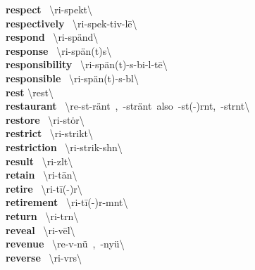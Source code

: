 \documentclass[10pt,a4paper]{article}
\begin{document}
\begin{multicols}{2}
\textbf{ respect }\quad \ \textbackslash ri-\textprimstress spekt\textbackslash \\
\textbf{ respectively }\quad \ \textbackslash ri-\textprimstress spek-tiv-l\={e}\textbackslash \\
\textbf{ respond }\quad \ \textbackslash ri-\textprimstress sp\"{a}nd\textbackslash \\
\textbf{ response }\quad \ \textbackslash ri-\textprimstress sp\"{a}n(t)s\textbackslash \\
\textbf{ responsibility }\quad \ \textbackslash ri-\textsecstress sp\"{a}n(t)-s\textschwa -\textprimstress bi-l\textschwa -t\={e}\textbackslash \\
\textbf{ responsible }\quad \ \textbackslash ri-\textprimstress sp\"{a}n(t)-s\textschwa -b\textschwa l\textbackslash \\
\textbf{ rest }\quad \textbackslash \textprimstress rest\textbackslash \\
\textbf{ restaurant }\quad \ \textbackslash \textprimstress re-st\textschwa -\textsecstress r\"{a}nt\ ,\ -str\"{a}nt\ also\ -st(\textschwa -)r\textschwa nt,\ -st\textschwa rnt\textbackslash \\
\textbf{ restore }\quad \ \textbackslash ri-\textprimstress st\.{o}r\textbackslash \\
\textbf{ restrict }\quad \ \textbackslash ri-\textprimstress strikt\textbackslash \\
\textbf{ restriction }\quad \ \textbackslash ri-\textprimstress strik-sh\textschwa n\textbackslash \\
\textbf{ result }\quad \ \textbackslash ri-\textprimstress z\textschwa lt\textbackslash \\
\textbf{ retain }\quad \ \textbackslash ri-\textprimstress t\={a}n\textbackslash \\
\textbf{ retire }\quad \ \textbackslash ri-\textprimstress t\={i}(-\textschwa )r\textbackslash \\
\textbf{ retirement }\quad \ \textbackslash ri-\textprimstress t\={i}(-\textschwa )r-m\textschwa nt\textbackslash \\
\textbf{ return }\quad \ \textbackslash ri-\textprimstress t\textschwa rn\textbackslash \\
\textbf{ reveal }\quad \ \textbackslash ri-\textprimstress v\={e}l\textbackslash \\
\textbf{ revenue }\quad \ \textbackslash \textprimstress re-v\textschwa -\textsecstress n\"{u}\ ,\ -\textsecstress ny\"{u}\textbackslash \\
\textbf{ reverse }\quad \ \textbackslash ri-\textprimstress v\textschwa rs\textbackslash \\

\end{multicols}
\end{document}
